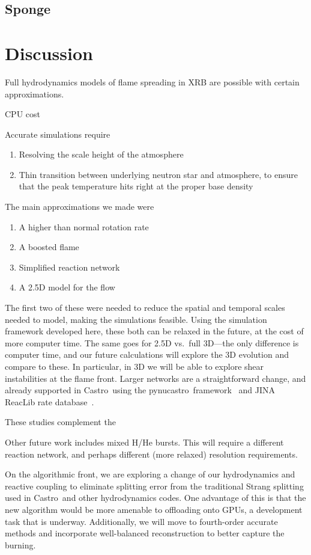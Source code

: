 \documentclass[twocolumn,times,tighten]{aastex62}
\newcommand{\castro}{{\sf Castro}}
\newcommand{\pynucastro}{{\sf pynucastro}}
\begin{document}
\subsection{Sponge}



\section{Discussion}

Full hydrodynamics models of flame spreading in XRB are possible with certain approximations.

CPU cost

Accurate simulations require
\begin{enumerate}
\item Resolving the scale height of the atmosphere

\item Thin transition between underlying neutron star and atmosphere, to ensure that the peak temperature
hits right at the proper base density
\end{enumerate}

The main approximations we made were
\begin{enumerate}
\item A higher than normal rotation rate
\item A boosted flame
\item Simplified reaction network
\item A 2.5D model for the flow
\end{enumerate}
The first two of these were needed to reduce the spatial and temporal
scales needed to model, making the simulations feasible.  Using the
simulation framework developed here, these both can be relaxed in the
future, at the cost of more computer time.  The same goes for 2.5D
vs.\ full 3D---the only difference is computer time, and our future
calculations will explore the 3D evolution and compare to these.  In particular,
in 3D we will be able to explore shear instabilities at the flame front.
Larger networks are a straightforward change, and already supported in
\castro\ using the \pynucastro\ framework~\citep{pynucastro} and JINA
ReacLib rate database~\citep{reaclib}.

These studies complement the

Other future work includes mixed H/He bursts.  This will require a
different reaction network, and perhaps different (more relaxed)
resolution requirements.

On the algorithmic front, we are exploring a change of our
hydrodynamics and reactive coupling to eliminate splitting error from
the traditional Strang splitting used in \castro\ and other
hydrodynamics codes.  One advantage of this is that the new algorithm
would be more amenable to offloading onto GPUs, a development task
that is underway.  Additionally, we will move to fourth-order accurate
methods and incorporate well-balanced reconstruction to better capture
the burning.
\end{document}
